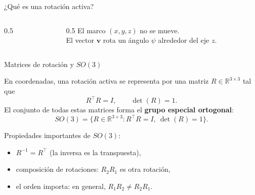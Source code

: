 \documentclass[11pt]{beamer}
\begin{document}
\begin{frame}{¿Qué es una rotación activa?}
\begin{columns}[T]
\begin{column}{0.5\textwidth}
  \end{column}

    \begin{column}{0.5\textwidth}
    El marco \((x,y,z)\) no se mueve.\\[4pt]
    El vector \(\bm{v}\) rota un ángulo \(\psi\) alrededor del eje \(z\).
  \end{column}
\end{columns}

\end{frame}

\begin{frame}{Matrices de rotación y \(SO(3)\)}

En coordenadas, una rotación activa se representa por una matriz
\(R \in \mathbb{R}^{3\times 3}\) tal que
\[
R^{\top}R = I, \qquad \det(R) = 1.
\]
El conjunto de todas estas matrices forma el \textbf{grupo especial ortogonal}:
\[
SO(3) = \{R \in \mathbb{R}^{3\times 3} : R^{\top}R = I,\ \det(R) = 1\}.
\]

\medskip
Propiedades importantes de \(SO(3)\):
\begin{itemize}
  \item \(R^{-1} = R^{\top}\) (la inversa es la transpuesta),
  \item composición de rotaciones: \(R_2 R_1\) es otra rotación,
  \item el orden importa: en general, \(R_1 R_2 \neq R_2 R_1\).
\end{itemize}

\end{frame}

\end{document}
